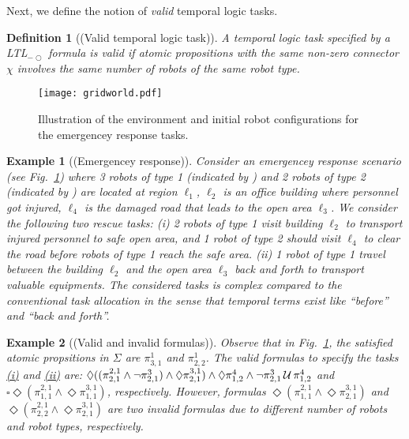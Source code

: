 \documentclass[Afour,sageh,times]{sagej}
\newtheorem{exmp}{Example}
\newtheorem{defn}[thm]{Definition}
\newcommand{\ltl}{ {\it LTL}$_{-\bigcirc}$ }
\renewcommand{\ap}[3]{\mathcal{\pi}_{{#1},{#2}}^{#3}}
\newenvironment{cexmp}
{\addtocounter{exmp}{-1}\begin{exmp}}
  {\end{exmp}}
\newlength\myheight
\newlength\mydepth
\newcommand*\inlinegraphics[1]{%
  \settototalheight\myheight{Xygp}%
  \settodepth\mydepth{Xygp}%
  \raisebox{-0.7\mydepth}{\texttt{[image: \#1]}}%
}
\begin{document}
 Next, we define the notion of {\it valid} temporal logic tasks.
 \begin{defn}[(Valid temporal logic task)]\label{defn:valid}
A temporal logic task specified by a\ltl formula is valid if atomic propositions with the same non-zero connector $\chi$ involves the same number of robots of the same robot type.
 \end{defn}

 \begin{figure}[!t]
    \centering
    \texttt{[image: gridworld.pdf]}
    \caption{Illustration of the environment and initial robot configurations for the emergencey response tasks.}\label{fig:workspace}
\end{figure}
\begin{exmp}[(Emergencey response)]\label{exmp:1}
  Consider an emergencey response scenario (see Fig.~\ref{fig:workspace}) where 3 robots of type 1 (indicated by \inlinegraphics{star.pdf}) and 2 robots of type 2 (indicated by \inlinegraphics{bluedot.pdf}) are located at region $\ell_1$, $\ell_2$ is an office building where personnel got injured, $\ell_4$ is the damaged road that leads to the open area $\ell_3$. We consider the following two rescue tasks: {\it (i)} \label{task:i} 2 robots of type 1 visit building $\ell_2$ to transport injured personnel to safe open area, and 1 robot of type 2 should visit $\ell_4$ to clear the road before robots of type 1 reach the safe area. {\it (ii)} \label{task:ii} 1 robot of type 1 travel between the building $\ell_2$ and the open area $\ell_3$ back and forth to transport valuable equipments. The considered tasks is complex compared to the conventional task allocation  in the sense that temporal terms exist like ``before'' and ``back and forth''.
\end{exmp}


 \begin{cexmp} [(Valid and invalid formulas)]
Observe that in Fig.~\ref{fig:workspace}, the satisfied atomic propsitions in $\Sigma$ are $\ap{3}{1}{1}$ and $\ap{2}{2}{1}$.   The valid formulas to specify the tasks \hyperref[task:i]{\it (i)} and \hyperref[task:ii]{\it (ii)} are: $\Diamond \Large((\ap{2}{1}{2,1}\wedge \neg \ap{2}{1}{3}) \wedge  \Diamond \ap{2}{1}{3,1}\Large)  \wedge \Diamond \ap{1}{2}{4} \wedge \neg \ap{2}{1}{3} \,\mathcal{U}\, \ap{1}{2}{4}$ and $\square \Diamond (\ap{1}{1}{2,1} \wedge \Diamond \ap{1}{1}{3,1})$, respectively. However, formulas $\Diamond (\ap{1}{1}{2,1} \wedge \Diamond \ap{2}{1}{3,1})$ and $\Diamond (\ap{2}{2}{2,1} \wedge \Diamond \ap{2}{1}{3,1})$ are two invalid formulas due to different number of robots and robot types, respectively.
 \end{cexmp}
\end{document}

